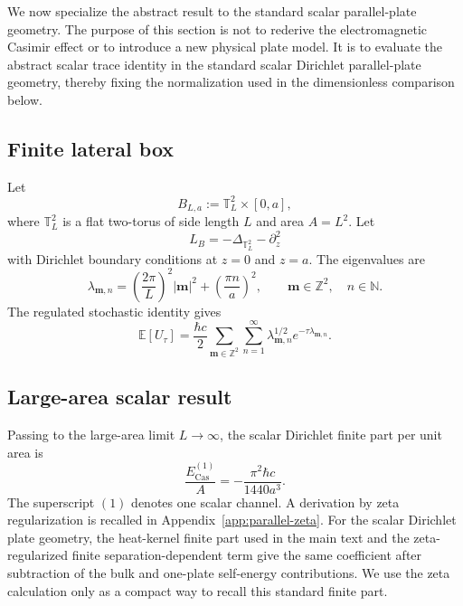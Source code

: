 \documentclass[11pt]{article}
\newcommand{\E}{\mathbb{E}}
\begin{document}
We now specialize the abstract result to the standard scalar parallel-plate geometry.  The purpose of this section is not to rederive the electromagnetic Casimir effect or to introduce a new physical plate model.  It is to evaluate the abstract scalar trace identity in the standard scalar Dirichlet parallel-plate geometry, thereby fixing the normalization used in the dimensionless comparison below.

\subsection{Finite lateral box}

Let
\[
    B_{L,a}:=\mathbb{T}_L^2\times[0,a],
\]
where $\mathbb{T}_L^2$ is a flat two-torus of side length $L$ and area $A=L^2$.  Let
\[
    L_B=-\Delta_{\mathbb{T}_L^2}-\partial_z^2
\]
with Dirichlet boundary conditions at $z=0$ and $z=a$.  The eigenvalues are
\begin{equation}
    \lambda_{\mathbf{m},n}
    =\left(\frac{2\pi}{L}\right)^2|\mathbf{m}|^2+\left(\frac{\pi n}{a}\right)^2,
    \qquad
    \mathbf{m}\in\mathbb{Z}^2,
    \quad n\in\mathbb{N}.
    \label{eq:plate-eigenvalues}
\end{equation}
The regulated stochastic identity gives
\begin{equation}
    \E[U_\tau]
    =\frac{\hbar c}{2}\sum_{\mathbf{m}\in\mathbb{Z}^2}\sum_{n=1}^\infty
    \lambda_{\mathbf{m},n}^{1/2}e^{-\tau\lambda_{\mathbf{m},n}}.
    \label{eq:finite-box-trace}
\end{equation}

\subsection{Large-area scalar result}

Passing to the large-area limit $L\to\infty$, the scalar Dirichlet finite part per unit area is
\begin{equation}
    \frac{E_{\mathrm{Cas}}^{(1)}}{A}
    =-\frac{\pi^2\hbar c}{1440a^3}.
    \label{eq:scalar-casimir-per-area}
\end{equation}
The superscript $(1)$ denotes one scalar channel.  A derivation by zeta regularization is recalled in Appendix~\ref{app:parallel-zeta}.  For the scalar Dirichlet plate geometry, the heat-kernel finite part used in the main text and the zeta-regularized finite separation-dependent term give the same coefficient after subtraction of the bulk and one-plate self-energy contributions.  We use the zeta calculation only as a compact way to recall this standard finite part.
\end{document}

